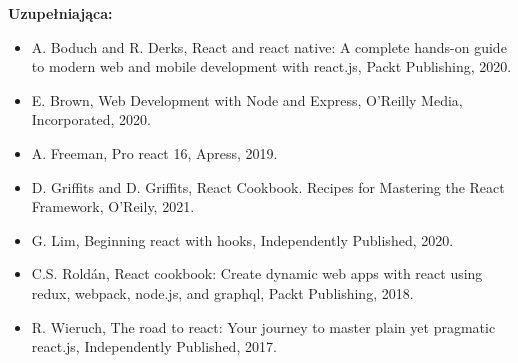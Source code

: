\documentclass[12pt, a4paper]{article}
\begin{document}
\textbf{Uzupełniająca:}
\begin{itemize}
  \item A. Boduch and R. Derks, React and react native: A complete hands-on guide to modern web and mobile development with react.js, Packt Publishing, 2020.
  \item E. Brown, Web Development with Node and Express, O'Reilly Media, Incorporated, 2020.
  \item A. Freeman, Pro react 16, Apress, 2019.
  \item D. Griffits and D. Griffits, React Cookbook. Recipes for Mastering the React Framework, O'Reily, 2021.
  \item G. Lim, Beginning react with hooks, Independently Published, 2020.
  \item C.S. Roldán, React cookbook: Create dynamic web apps with react using redux, webpack, node.js, and graphql, Packt Publishing, 2018.
  \item R. Wieruch, The road to react: Your journey to master plain yet pragmatic react.js, Independently Published, 2017.
\end{itemize}
\end{document}
